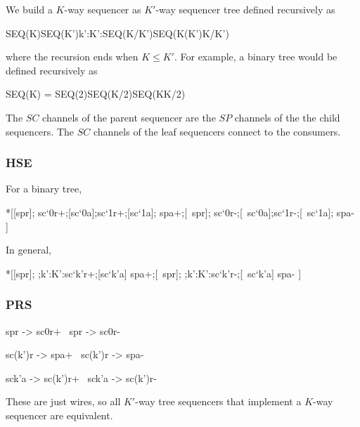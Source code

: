 \documentclass{article}
\begin{document}
\noindent
We build a $K$-way sequencer as $K'$-way sequencer tree defined recursively as

\begin{csp}
SEQ(K)\equiv\!SEQ(K')\pll\langle\pll\!k':K':SEQ(K/K')\rangle\pll\!SEQ(K\-(K')K/K')
\end{csp}

\noindent where the recursion ends when $K\le K'$. For example, a binary tree
would be defined recursively as

\begin{csp}
SEQ(K) = SEQ(2)\pll\!SEQ(K/2)\pll\!SEQ(K\-K/2)
\end{csp}

\noindent
The $SC$ channels of the parent sequencer are the $SP$ channels of the the child 
sequencers. The $SC$ channels of the leaf sequencers connect to the consumers.

\subsubsection*{HSE}

For a binary tree,

\begin{hse}
*[[spr];
  sc`0r+;[sc`0a];sc`1r+;[sc`1a];
  spa+;[~spr];
  sc`0r-;[~sc`0a];sc`1r-;[~sc`1a];
  spa-
 ]
\end{hse}

\noindent
In general,

\begin{hse}
*[[spr];
  \langle;k':K':sc`k'r+;[sc`k'a]\rangle
  spa+;[~spr];
  \langle;k':K':sc`k'r-;[~sc`k'a]\rangle
  spa-
 ]
\end{hse}

\subsubsection*{PRS}

\begin{prs2}
spr -> sc0r+
~spr -> sc0r-

sc(k')r -> spa+
~sc(k')r -> spa-
\end{prs2}

\begin{prs2}
sck'a -> sc(k')r+
~sck'a -> sc(k')r-
\end{prs2}

\noindent
These are just wires, so all $K'$-way tree sequencers that implement a 
$K$-way sequencer are equivalent.

\end{document}
